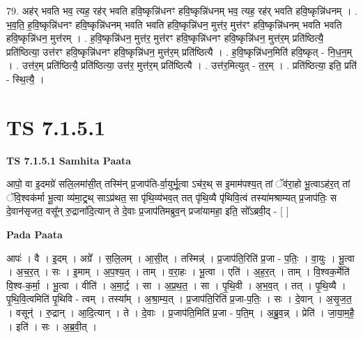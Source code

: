 \documentclass[17pt]{extarticle}
\begin{document}
79. अह॑र् भवति भव॒ त्यह॒ रह॑र् भवति हवि॒ष्कृन्नि॑धनꣳ हवि॒ष्कृन्नि॑धनम् भव॒ त्यह॒ रह॑र् भवति हवि॒ष्कृन्नि॑धनम् । . भ॒व॒ति॒ ह॒वि॒ष्कृन्नि॑धनꣳ हवि॒ष्कृन्नि॑धनम् भवति भवति हवि॒ष्कृन्नि॑धन॒ मुत्त॑र॒ मुत्त॑रꣳ हवि॒ष्कृन्नि॑धनम् भवति भवति हवि॒ष्कृन्नि॑धन॒ मुत्त॑रम् । . ह॒वि॒ष्कृन्नि॑धन॒ मुत्त॑र॒ मुत्त॑रꣳ हवि॒ष्कृन्नि॑धनꣳ हवि॒ष्कृन्नि॑धन॒ मुत्त॑र॒म् प्रति॑ष्ठित्यै॒ प्रति॑ष्ठित्या॒ उत्त॑रꣳ हवि॒ष्कृन्नि॑धनꣳ हवि॒ष्कृन्नि॑धन॒ मुत्त॑र॒म् प्रति॑ष्ठित्यै । . ह॒वि॒ष्कृन्नि॑धन॒मिति॑ हवि॒ष्कृत् - नि॒ध॒न॒म् । . उत्त॑र॒म् प्रति॑ष्ठित्यै॒ प्रति॑ष्ठित्या॒ उत्त॑र॒ मुत्त॑र॒म् प्रति॑ष्ठित्यै । . उत्त॑र॒मित्युत् - त॒र॒म् । . प्रति॑ष्ठित्या॒ इति॒ प्रति॑ - स्थि॒त्यै॒ । \newline
\pagebreak
{}

\section{ TS 7.1.5.1 }

\textbf{TS 7.1.5.1 } \newline
\textbf{Samhita Paata} \newline

आपो॒ वा इ॒दमग्रे॑ सलि॒लमा॑सी॒त् तस्मि॑न् प्र॒जाप॑ति-र्वा॒युर्भू॒त्वा ऽच॑र॒थ् स इ॒माम॑पश्य॒त् तां ॅव॑रा॒हो भू॒त्वाऽह॑र॒त् तां ॅवि॒श्वक॑र्मा भू॒त्वा व्य॑मा॒ट्र्थ् साऽप्र॑थत॒ सा पृ॑थि॒व्य॑भव॒त् तत् पृ॑थि॒व्यै पृ॑थिवि॒त्वं तस्या॑मश्राम्यत् प्र॒जाप॑तिः॒ स दे॒वान॑सृजत॒ वसू᳚न् रु॒द्राना॑दि॒त्यान् ते दे॒वाः प्र॒जाप॑तिमब्रुव॒न् प्रजा॑यामहा॒ इति॒ सो᳚ऽब्रवी॒द् - [  ] \newline

\textbf{Pada Paata} \newline

आपः॑ । वै । इ॒दम् । अग्रे᳚ । स॒लि॒लम् । आ॒सी॒त् । तस्मिन्न्॑ । प्र॒जाप॑ति॒रिति॑ प्र॒जा - प॒तिः॒ । वा॒युः । भू॒त्वा । अ॒च॒र॒त् । सः । इ॒माम् । अ॒प॒श्य॒त् । ताम् । व॒रा॒हः । भू॒त्वा । एति॑ । अ॒ह॒र॒त् । ताम् । वि॒श्वक॒र्मेति॑ वि॒श्व-क॒र्मा॒ । भू॒त्वा । वीति॑ । अ॒मा॒र्ट्॒ । सा । अ॒प्र॒थ॒त॒ । सा । पृ॒थि॒वी । अ॒भ॒व॒त् । तत् । पृ॒थि॒व्यै । पृ॒थि॒वि॒त्वमिति॑ पृ॒थिवि - त्वम् । तस्या᳚म् । अ॒श्रा॒म्य॒त् । प्र॒जाप॑ति॒रिति॑ प्र॒जा-प॒तिः॒ । सः । दे॒वान् । अ॒सृ॒ज॒त॒ । वसून्॑ । रु॒द्रान् । आ॒दि॒त्यान् । ते । दे॒वाः । प्र॒जाप॑ति॒मिति॑ प्र॒जा - प॒ति॒म् । अ॒ब्रु॒व॒न्न् । प्रेति॑ । जा॒या॒म॒है॒ । इति॑ । सः । अ॒ब्र॒वी॒त् ।  \newline
\end{document}
